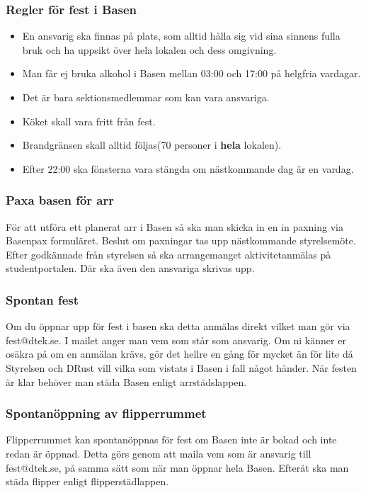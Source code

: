 \subsubsection{Regler för fest i Basen}
\begin{itemize}
    \item En ansvarig ska finnas på plats, som alltid hålla sig vid sina sinnens fulla bruk och ha uppsikt över hela lokalen och dess omgivning.
    \item Man får ej bruka alkohol i Basen mellan 03:00 och 17:00 på helgfria vardagar.
    \item Det är bara sektionsmedlemmar som kan vara ansvariga.
    \item Köket skall vara fritt från fest.
    \item Brandgränsen skall alltid följas(70 personer i \textbf{hela} lokalen).
    \item Efter 22:00 ska fönsterna vara stängda om nästkommande dag är en vardag.
\end{itemize}

\subsubsection{Paxa basen för arr}
För att utföra ett planerat arr i Basen så ska man skicka in en in paxning via Basenpax formuläret. Beslut om paxningar tas upp nästkommande styrelsemöte.
Efter godkännade från styrelsen så ska arrangemanget aktivitetanmälas på studentportalen. Där ska även den ansvariga skrivas upp.

\subsubsection{Spontan fest}
Om du öppnar upp för fest i basen ska detta anmälas direkt vilket man gör via fest@dtek.se.
I mailet anger man vem som står som ansvarig. Om ni känner er osäkra på om en anmälan
krävs, gör det hellre en gång för mycket än för lite då Styrelsen och DRust vill vilka som
vistats i Basen i fall något händer. 
När festen är klar behöver man städa Basen enligt arrstädslappen.

\subsubsection{Spontanöppning av flipperrummet}
Flipperrummet kan spontanöppnas för fest om Basen inte är bokad och inte redan är öppnad.
Detta görs genom att maila vem som är ansvarig till fest@dtek.se, på samma sätt som när man öppnar hela Basen.
Efteråt ska man städa flipper enligt flipperstädlappen.

